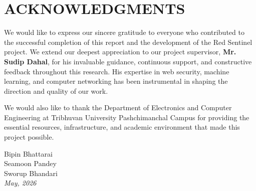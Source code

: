 \chapter*{\MakeUppercase{Acknowledgments}}
We would like to express our sincere gratitude to everyone who contributed to the successful completion of this report and the development of the Red Sentinel project. We extend our deepest appreciation to our project supervisor, \textbf{Mr. Sudip Dahal}, for his invaluable guidance, continuous support, and constructive feedback throughout this research. His expertise in web security, machine learning, and computer networking has been instrumental in shaping the direction and quality of our work.

We would also like to thank the Department of Electronics and Computer Engineering at Tribhuvan University Pashchimanchal Campus for providing the essential resources, infrastructure, and academic environment that made this project possible.
\vspace{1cm}

\begin{flushright}
Bipin Bhattarai \\
Seamoon Pandey \\
Sworup Bhandari \\
\vspace{0.5cm}
\textit{May, 2026}
\end{flushright}
